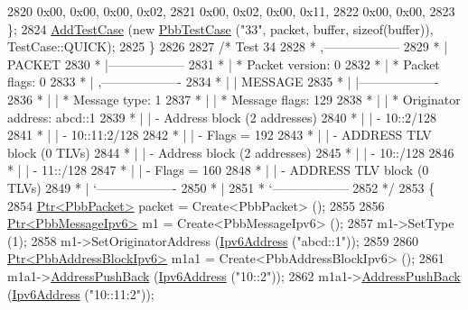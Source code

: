 \begin{DoxyCode}
2820       0x00, 0x00, 0x00, 0x02,
2821       0x00, 0x02, 0x00, 0x11,
2822       0x00, 0x00,
2823     \};
2824     \hyperlink{classns3_1_1TestCase_a3718088e3eefd5d6454569d2e0ddd835}{AddTestCase} (\textcolor{keyword}{new} \hyperlink{classPbbTestCase}{PbbTestCase} (\textcolor{stringliteral}{"33"}, packet, buffer, \textcolor{keyword}{sizeof}(buffer)), 
      TestCase::QUICK);
2825   \}
2826 
2827   \textcolor{comment}{/* Test 34}
2828 \textcolor{comment}{         * ,------------------}
2829 \textcolor{comment}{         * |  PACKET}
2830 \textcolor{comment}{         * |------------------}
2831 \textcolor{comment}{         * | * Packet version:    0}
2832 \textcolor{comment}{         * | * Packet flags:  0}
2833 \textcolor{comment}{         * |    ,-------------------}
2834 \textcolor{comment}{         * |    |  MESSAGE}
2835 \textcolor{comment}{         * |    |-------------------}
2836 \textcolor{comment}{         * |    | * Message type:       1}
2837 \textcolor{comment}{         * |    | * Message flags:  129}
2838 \textcolor{comment}{         * |    | * Originator address: abcd::1}
2839 \textcolor{comment}{         * |    | - Address block (2 addresses)}
2840 \textcolor{comment}{         * |    |     - 10::2/128}
2841 \textcolor{comment}{         * |    |     - 10::11:2/128}
2842 \textcolor{comment}{         * |    |     - Flags = 192}
2843 \textcolor{comment}{         * |    | - ADDRESS TLV block (0 TLVs)}
2844 \textcolor{comment}{         * |    | - Address block (2 addresses)}
2845 \textcolor{comment}{         * |    |     - 10::/128}
2846 \textcolor{comment}{         * |    |     - 11::/128}
2847 \textcolor{comment}{         * |    |     - Flags = 160}
2848 \textcolor{comment}{         * |    | - ADDRESS TLV block (0 TLVs)}
2849 \textcolor{comment}{         * |    `-------------------}
2850 \textcolor{comment}{         * |}
2851 \textcolor{comment}{         * `------------------}
2852 \textcolor{comment}{   */}
2853   \{
2854     \hyperlink{classns3_1_1Ptr}{Ptr<PbbPacket>} packet = Create<PbbPacket> ();
2855 
2856     \hyperlink{classns3_1_1Ptr}{Ptr<PbbMessageIpv6>} m1 = Create<PbbMessageIpv6> ();
2857     m1->SetType (1);
2858     m1->SetOriginatorAddress (\hyperlink{classns3_1_1Ipv6Address}{Ipv6Address} (\textcolor{stringliteral}{"abcd::1"}));
2859 
2860     \hyperlink{classns3_1_1Ptr}{Ptr<PbbAddressBlockIpv6>} m1a1 = Create<PbbAddressBlockIpv6> ();
2861     m1a1->\hyperlink{classns3_1_1PbbAddressBlock_a7be545a53d69bd426dbebcf752ed8371}{AddressPushBack} (\hyperlink{classns3_1_1Ipv6Address}{Ipv6Address} (\textcolor{stringliteral}{"10::2"}));
2862     m1a1->\hyperlink{classns3_1_1PbbAddressBlock_a7be545a53d69bd426dbebcf752ed8371}{AddressPushBack} (\hyperlink{classns3_1_1Ipv6Address}{Ipv6Address} (\textcolor{stringliteral}{"10::11:2"}));

\end{DoxyCode}
